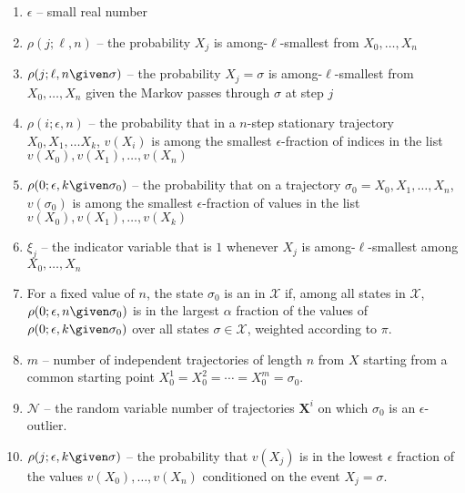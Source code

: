 \documentclass[12pt]{article}
\begin{document}
\begin{enumerate}
    \item
        \( \epsilon \) -- small real number
    \item
        \( \rho(j; \ell, n) \) -- the probability \( X_j \) is among-\(
        \ell \)-smallest from \( X_0, \dots, X_n \)
    \item
        \( \rho(j; \ell, n \given \sigma) \) -- the probability \( X_j =
        \sigma \) is among-\( \ell \)-smallest from \( X_0, \dots, X_n \)
        given the Markov passes through \( \sigma \) at step \( j \)
    \item
        \( \rho(i; \epsilon, n) \) -- the probability that in a \( n \)-step
        stationary trajectory \( X_0, X_1, \dots X_k \), \( v(X_i) \) is
        among the smallest \( \epsilon \)-fraction of indices in the
        list \( v(X_0), v(X_1), \dots, v(X_n) \)
    \item
        \( \rho(0; \epsilon, k \given \sigma_0) \) -- the probability
        that on a trajectory \( \sigma_0 = X_0, X_1, \dots, X_n \), \( v
        (\sigma_0) \) is among the smallest \( \epsilon \)-fraction of
        values in the list \( v(X_0), v(X_1), \dots, v(X_k) \)
    \item
        \( \xi_j \) -- the indicator variable that is \( 1 \) whenever \(
        X_j \) is among-\( \ell \)-smallest among \( X_0, \dots , X_n \)
    \item
        For a fixed value of \( n \), the state \( \sigma_0 \) is an
         in \( \mathcal{X} \) if,
        among all states in \( \mathcal{X} \), \( \rho(0; \epsilon, n
        \given \sigma_{0}) \) is in the largest \( \alpha \) fraction of
        the values of \( \rho(0; \epsilon, k \given \sigma_{0}) \) over
        all states \( \sigma \in \mathcal{X} \), weighted according to \(
        \pi \).
    \item
        \( m \) -- number of independent trajectories of length \( n \)
        from \( X \) starting from a common starting point \( X_0^1 = X_0^2
        = \cdots = X_0^m = \sigma_0 \).
    \item
        \( \mathcal{N} \) -- the random variable number of trajectories \(
        \mathbf{X}^i \) on which \( \sigma_0 \) is an \( \epsilon \)-outlier.
    \item
        \( \rho(j; \epsilon,k \given \sigma) \) -- the probability that \(
        v(X_j) \) is in the lowest \( \epsilon \) fraction of the values
        \( v(X_0), \dots, v(X_n) \) conditioned on the event \( X_j =
        \sigma \).

\end{enumerate}
\end{document}
